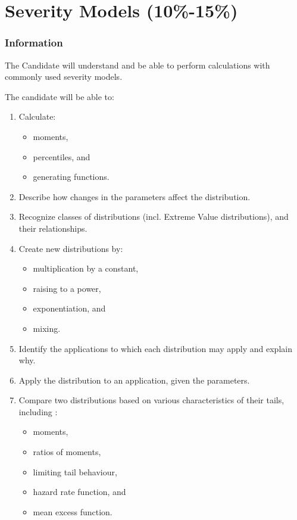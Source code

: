 \chapter[Severity Models]{Severity Models (10\%-15\%)}

\subsection{Information}

\begin{distributions}[Objective]
The Candidate will understand and be able to perform calculations with commonly used severity models.
\end{distributions}
\begin{outcomes}
The candidate will be able to:
\begin{enumerate}[label = \alph*), leftmargin = *]
	\item	\textcolor{ao(english)}{Calculate}:
		\begin{itemize}[leftmargin = *]
		\item	moments,
		\item	percentiles, and
		\item	generating functions.
		\end{itemize}
	\item	\textcolor{babyblue}{Describe} how changes in the parameters affect the distribution.
	\item	\textcolor{babyblue}{Recognize} classes of distributions (incl. Extreme Value distributions), and \textcolor{emerald}{their relationships}.
	\item	\textcolor{amaranth}{Create} new distributions by:
		\begin{itemize}[leftmargin = *]
		\item	multiplication by a constant, 
		\item	raising to a power, 
		\item	exponentiation, and 
		\item	mixing.
		\end{itemize}
	\item	\textcolor{babyblue}{Identify} the applications to which each distribution may apply and \textcolor{amber}{explain} why.
	\item	\textcolor{ao(english)}{Apply} the distribution to an application, given the parameters.
	\item	\textcolor{emerald}{Compare} two distributions based on various characteristics of their tails, including :
		\begin{itemize}[leftmargin = *]
		\item	moments,
		\item	ratios of moments, 
		\item	limiting tail behaviour, 
		\item	hazard rate function, and 
		\item	mean excess function.
		\end{itemize}
\end{enumerate}
\end{outcomes}

